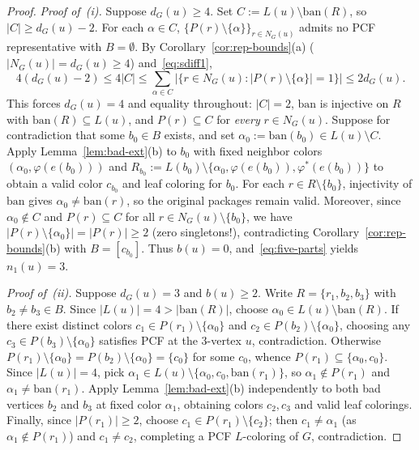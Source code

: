 \documentclass[11pt,a4paper]{article}
\theoremstyle{definition}
\begin{document}
\begin{proof}
\emph{Proof of~(i).} Suppose $d_G(u) \ge 4$. Set $C := L(u) \setminus \mathrm{ban}(R)$, so $|C| \ge d_G(u) - 2$. For each $\alpha \in C$, $\{P(r) \setminus \{\alpha\}\}_{r \in N_G(u)}$ admits no PCF representative with $B = \emptyset$. By Corollary~\ref{cor:rep-bounds}(a) ($|N_G(u)| = d_G(u) \ge 4$) and~\eqref{eq:sdiff1},
\[
  4(d_G(u) - 2) \le 4|C| \le \sum_{\alpha \in C} \bigl|\{r \in N_G(u) : |P(r) \setminus \{\alpha\}| = 1\}\bigr| \le 2 d_G(u).
\]
This forces $d_G(u) = 4$ and equality throughout: $|C| = 2$, $\mathrm{ban}$ is injective on $R$ with $\mathrm{ban}(R) \subseteq L(u)$, and $P(r) \subseteq C$ for \emph{every} $r \in N_G(u)$. Suppose for contradiction that some $b_0 \in B$ exists, and set $\alpha_0 := \mathrm{ban}(b_0) \in L(u) \setminus C$. Apply Lemma~\ref{lem:bad-ext}(b) to $b_0$ with fixed neighbor colors $(\alpha_0, \varphi(e(b_0)))$ and $R_{b_0} := L(b_0) \setminus \{\alpha_0, \varphi(e(b_0)), \varphi^*(e(b_0))\}$ to obtain a valid color $c_{b_0}$ and leaf coloring for $b_0$. For each $r \in R \setminus \{b_0\}$, injectivity of $\mathrm{ban}$ gives $\alpha_0 \neq \mathrm{ban}(r)$, so the original packages remain valid. Moreover, since $\alpha_0 \notin C$ and $P(r) \subseteq C$ for all $r \in N_G(u) \setminus \{b_0\}$, we have $|P(r) \setminus \{\alpha_0\}| = |P(r)| \ge 2$ (zero singletons!), contradicting Corollary~\ref{cor:rep-bounds}(b) with $B = [c_{b_0}]$. Thus $b(u) = 0$, and~\eqref{eq:five-parts} yields $n_1(u) = 3$.

\emph{Proof of~(ii).} Suppose $d_G(u) = 3$ and $b(u) \ge 2$. Write $R = \{r_1, b_2, b_3\}$ with $b_2 \neq b_3 \in B$. Since $|L(u)| = 4 > |\mathrm{ban}(R)|$, choose $\alpha_0 \in L(u) \setminus \mathrm{ban}(R)$. If there exist distinct colors $c_1 \in P(r_1) \setminus \{\alpha_0\}$ and $c_2 \in P(b_2) \setminus \{\alpha_0\}$, choosing any $c_3 \in P(b_3) \setminus \{\alpha_0\}$ satisfies PCF at the $3$-vertex $u$, contradiction. Otherwise $P(r_1) \setminus \{\alpha_0\} = P(b_2) \setminus \{\alpha_0\} = \{c_0\}$ for some $c_0$, whence $P(r_1) \subseteq \{\alpha_0, c_0\}$. Since $|L(u)| = 4$, pick $\alpha_1 \in L(u) \setminus \{\alpha_0, c_0, \mathrm{ban}(r_1)\}$, so $\alpha_1 \notin P(r_1)$ and $\alpha_1 \neq \mathrm{ban}(r_1)$. Apply Lemma~\ref{lem:bad-ext}(b) independently to both bad vertices $b_2$ and $b_3$ at fixed color $\alpha_1$, obtaining colors $c_2, c_3$ and valid leaf colorings. Finally, since $|P(r_1)| \ge 2$, choose $c_1 \in P(r_1) \setminus \{c_2\}$; then $c_1 \neq \alpha_1$ (as $\alpha_1 \notin P(r_1)$) and $c_1 \neq c_2$, completing a PCF $L$-coloring of $G$, contradiction.
\end{proof}
\end{document}
